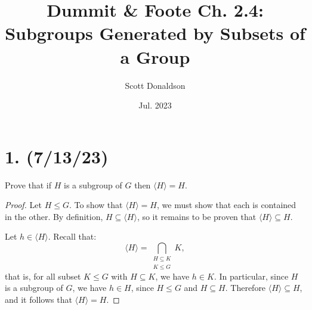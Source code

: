 \documentclass{article}
\title{Dummit \& Foote Ch. 2.4: Subgroups Generated by Subsets of a Group}
\author{Scott Donaldson}
\date{Jul. 2023}
\begin{document}
\maketitle

\section*{1. (7/13/23)}

Prove that if $H$ is a subgroup of $G$ then $\langle H \rangle = H$.

\begin{proof}
    Let $H \leq G$. To show that $\langle H \rangle = H$, we must show that each is contained in the other. By definition, $H \subseteq \langle H \rangle$, so it remains to be proven that $\langle H \rangle \subseteq H$.

    Let $h \in \langle H \rangle$. Recall that:
    \begin{equation*}
        \langle H \rangle = \bigcap_{\substack{H \subseteq K \\ K \leq G}} K,
    \end{equation*}
    that is, for all subset $K \leq G$ with $H \subseteq K$, we have $h \in K$. In particular, since $H$ is a subgroup of $G$, we have $h \in H$, since $H \leq G$ and $H \subseteq H$. Therefore $\langle H \rangle \subseteq H$, and it follows that $\langle H \rangle = H$.
\end{proof}
\end{document}
